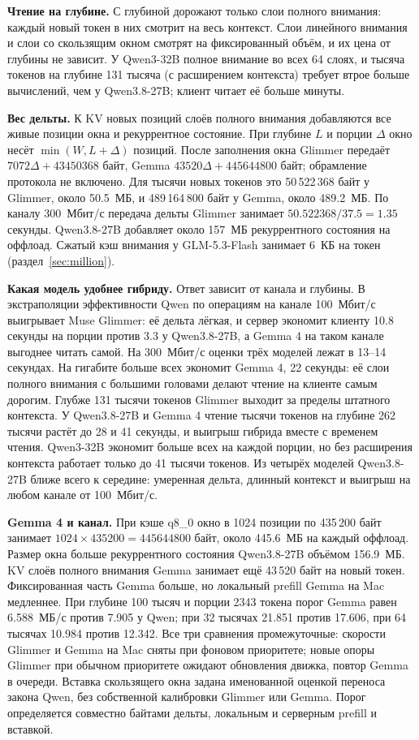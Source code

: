 \textbf{Чтение на глубине.} С глубиной дорожают только слои полного внимания: каждый новый токен в них смотрит на весь
контекст. Слои линейного внимания и слои со скользящим окном смотрят на фиксированный объём, и их цена от глубины не
зависит. У Qwen3-32B полное внимание во всех 64 слоях, и тысяча токенов на глубине 131 тысяча (с расширением контекста) требует втрое больше вычислений, чем у Qwen3.8-27B; клиент читает её больше минуты.

\textbf{Вес дельты.} К KV новых позиций слоёв полного внимания добавляются все живые позиции окна
и рекуррентное состояние. При глубине $L$ и порции $\Delta$ окно несёт $\min(W,L+\Delta)$ позиций.
После заполнения окна Glimmer передаёт $7072\Delta+43450368$ байт,
Gemma $43520\Delta+445644800$ байт; обрамление протокола не включено.
Для тысячи новых токенов это 50\,522\,368 байт у Glimmer, около 50.5~МБ, и 489\,164\,800 байт у Gemma,
около 489.2~МБ. По каналу 300~Мбит/с передача дельты Glimmer занимает $50.522368/37.5=1.35$ секунды.
Qwen3.8-27B добавляет около 157~МБ рекуррентного состояния на оффлоад.
Сжатый кэш внимания у GLM-5.3-Flash занимает 6~КБ на токен (раздел~\ref{sec:million}).

\textbf{Какая модель удобнее гибриду.} Ответ зависит от канала и глубины. В экстраполяции эффективности Qwen по операциям на канале 100~Мбит/с выигрывает Muse
Glimmer: её дельта лёгкая, и сервер экономит клиенту 10.8 секунды на порции против 3.3 у Qwen3.8-27B, а Gemma 4 на таком
канале выгоднее читать самой. На 300~Мбит/с оценки трёх моделей лежат в 13--14 секундах. На гигабите больше всех экономит
Gemma 4, 22 секунды: её слои полного внимания с большими головами делают чтение на клиенте самым дорогим. Глубже 131
тысячи токенов Glimmer выходит за пределы штатного контекста. У Qwen3.8-27B и Gemma 4 чтение тысячи токенов
на глубине 262 тысячи растёт до 28 и 41 секунды, и выигрыш гибрида вместе с временем чтения. Qwen3-32B экономит больше всех на каждой порции, но без расширения
контекста работает только до 41 тысячи токенов. Из четырёх моделей Qwen3.8-27B ближе всего к середине: умеренная
дельта, длинный контекст и выигрыш на любом канале от 100~Мбит/с.

\textbf{Gemma 4 и канал.} При кэше q8\_0 окно в 1024 позиции по 435\,200 байт
занимает $1024\times435200=445644800$ байт, около 445.6~МБ на каждый оффлоад.
Размер окна больше рекуррентного состояния Qwen3.8-27B объёмом 156.9~МБ.
KV слоёв полного внимания Gemma занимает ещё 43\,520 байт на новый токен.
Фиксированная часть Gemma больше, но локальный prefill Gemma на Mac медленнее.
При глубине 100 тысяч и порции 2343 токена порог Gemma равен 6.588~МБ/с против 7.905 у Qwen;
при 32 тысячах 21.851 против 17.606, при 64 тысячах 10.984 против 12.342.
Все три сравнения промежуточные: скорости Glimmer и Gemma на Mac сняты при фоновом приоритете;
новые опоры Glimmer при обычном приоритете ожидают обновления движка, повтор Gemma в очереди. Вставка скользящего окна задана именованной оценкой переноса закона Qwen,
без собственной калибровки Glimmer или Gemma.
Порог определяется совместно байтами дельты, локальным и серверным prefill и вставкой.


